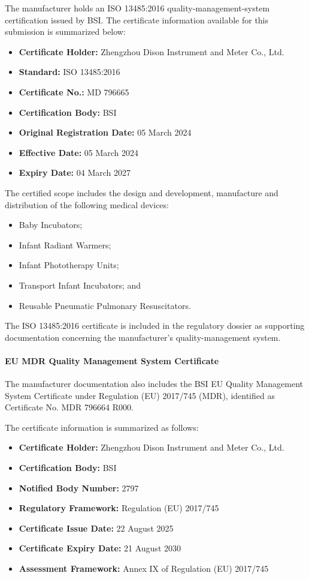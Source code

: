 The manufacturer holds an ISO 13485:2016 quality-management-system
certification issued by BSI. The certificate information available
for this submission is summarized below:

\begin{itemize}
    \item \textbf{Certificate Holder:}
    Zhengzhou Dison Instrument and Meter Co., Ltd.
    \item \textbf{Standard:} ISO 13485:2016
    \item \textbf{Certificate No.:} MD 796665
    \item \textbf{Certification Body:} BSI
    \item \textbf{Original Registration Date:} 05 March 2024
    \item \textbf{Effective Date:} 05 March 2024
    \item \textbf{Expiry Date:} 04 March 2027
\end{itemize}

The certified scope includes the design and development,
manufacture and distribution of the following medical devices:

\begin{itemize}
    \item Baby Incubators;
    \item Infant Radiant Warmers;
    \item Infant Phototherapy Units;
    \item Transport Infant Incubators; and
    \item Reusable Pneumatic Pulmonary Resuscitators.
\end{itemize}

The ISO 13485:2016 certificate is included in the regulatory
dossier as supporting documentation concerning the manufacturer's
quality-management system.

\paragraph{EU MDR Quality Management System Certificate}

The manufacturer documentation also includes the BSI EU Quality
Management System Certificate under Regulation (EU) 2017/745
(MDR), identified as Certificate No. MDR 796664 R000.

The certificate information is summarized as follows:

\begin{itemize}
    \item \textbf{Certificate Holder:}
    Zhengzhou Dison Instrument and Meter Co., Ltd.
    \item \textbf{Certification Body:} BSI
    \item \textbf{Notified Body Number:} 2797
    \item \textbf{Regulatory Framework:} Regulation (EU) 2017/745
    \item \textbf{Certificate Issue Date:} 22 August 2025
    \item \textbf{Certificate Expiry Date:} 21 August 2030
    \item \textbf{Assessment Framework:} Annex IX of Regulation (EU) 2017/745
\end{itemize}

